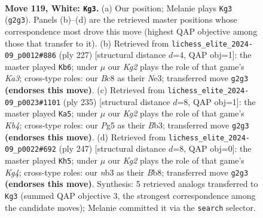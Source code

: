 \documentclass[11pt]{article}
\begin{document}
\clearpage

\begin{figure}[p]\centering
\begin{subfigure}{0.46\textwidth}\centering
\resizebox{\linewidth}{!}{%
\newchessgame
\chessboard[
  setfen={2B5/6k1/8/6PP/8/1n6/6K1/8 w - - 7 119},
  showmover=false,
  pgfstyle=straightmove, color=movearrow, markmove={g2-g3}
]}
\caption{}
\end{subfigure}\hfill
\begin{subfigure}{0.46\textwidth}\centering
\resizebox{\linewidth}{!}{%
\newchessgame
\chessboard[
  setfen={8/8/k2N4/2p5/p7/2K1n3/8/8 b - - 5 114},
  showmover=false,
  pgfstyle=straightmove, color=movearrow, markmove={a6-b6}
]}
\caption{}
\end{subfigure}
\\[4pt]
\begin{subfigure}{0.46\textwidth}\centering
\resizebox{\linewidth}{!}{%
\newchessgame
\chessboard[
  setfen={8/8/8/1k6/8/pb6/8/1K6 b - - 85 118},
  showmover=false,
  pgfstyle=straightmove, color=movearrow, markmove={b5-a5}
]}
\caption{}
\end{subfigure}\hfill
\begin{subfigure}{0.46\textwidth}\centering
\resizebox{\linewidth}{!}{%
\newchessgame
\chessboard[
  setfen={1b6/8/8/6k1/8/7p/8/6K1 b - - 19 124},
  showmover=false,
  pgfstyle=straightmove, color=movearrow, markmove={g5-h5}
]}
\caption{}
\end{subfigure}
\caption{\textbf{Move 119, White: \texttt{Kg3}.} (a) Our position; Melanie plays \texttt{Kg3} (\texttt{g2g3}). Panels (b)--(d) are the retrieved master positions whose correspondence most drove this move (highest QAP objective among those that transfer to it). (b) Retrieved from \texttt{lichess\_elite\_2024-09\_p0012\#886} (ply 227) [structural distance $d$=4, QAP obj=1]: the master played \texttt{Kb6}; under $\mu$ our \emph{Kg2} plays the role of that game's \emph{Ka3}; cross-type roles: our \emph{B}c8 as their \emph{N}e3; transferred move \texttt{g2g3} \textbf{(endorses this move)}. (c) Retrieved from \texttt{lichess\_elite\_2024-09\_p0023\#1101} (ply 235) [structural distance $d$=8, QAP obj=1]: the master played \texttt{Ka5}; under $\mu$ our \emph{Kg2} plays the role of that game's \emph{Kb4}; cross-type roles: our \emph{P}g5 as their \emph{B}b3; transferred move \texttt{g2g3} \textbf{(endorses this move)}. (d) Retrieved from \texttt{lichess\_elite\_2024-09\_p0022\#692} (ply 247) [structural distance $d$=8, QAP obj=0]: the master played \texttt{Kh5}; under $\mu$ our \emph{Kg2} plays the role of that game's \emph{Kg4}; cross-type roles: our \emph{n}b3 as their \emph{B}b8; transferred move \texttt{g2g3} \textbf{(endorses this move)}. Synthesis: 5 retrieved analogs transferred to \texttt{Kg3} (summed QAP objective 3, the strongest correspondence among the candidate moves); Melanie committed it via the \texttt{search} selector.}
\label{fig:thought-m236}
\end{figure}
\end{document}
